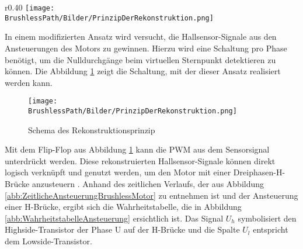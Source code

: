         \ifEMBED
        \begin{wrapfigure}{r}{0.40\textwidth}
            \texttt{[image: \\BrushlessPath/Bilder/PrinzipDerRekonstruktion.png]}
            \centering
            \caption[Schema des Rekonstruktionsprinzip]{Schema des Rekonstruktionsprinzip \cite{HSLU:Pluess}}
            \label{abb:PrinzipRekonstruktion}
            \end{wrapfigure}
        \fi
        In einem modifizierten Ansatz wird versucht, die Hallsensor-Signale 
        aus den Ansteuerungen des Motors zu gewinnen. Hierzu wird 
        eine Schaltung pro Phase benötigt, um die Nulldurchgänge beim 
        virtuellen Sternpunkt detektieren zu können. Die Abbildung 
        \ref{abb:PrinzipRekonstruktion} zeigt die Schaltung, mit der dieser Ansatz 
        realisiert werden kann. 
        \ifSTANDALONE
	\begin{figure}[h!]
            \centering
            \texttt{[image: \\BrushlessPath/Bilder/PrinzipDerRekonstruktion.png]}
           	\caption{Schema des Rekonstruktionsprinzip \protect\cite{HSLU:Pluess}}
            \label{abb:PrinzipRekonstruktion}
        \end{figure}
        \fi
        Mit dem Flip-Flop aus Abbildung \ref{abb:PrinzipRekonstruktion} kann die PWM aus dem 
        Sensorsignal unterdrückt werden. Diese rekonstruierten 
        Hallsensor-Signale können direkt logisch verknüpft und genutzt 
        werden, um den Motor mit einer Dreiphasen-H-Brücke anzusteuern 
        \cite{HSLU:Pluess}. Anhand des zeitlichen Verlaufs, der aus Abbildung 
        \ref{abb:ZeitlicheAnsteuerungBrushlessMotor} zu entnehmen ist und der 
        Ansteuerung einer H-Brücke, ergibt sich die Wahrheitstabelle, die in 
        Abbildung \ref{abb:WahrheitstabelleAnsteuerung} ersichtlich ist. Das 
        Signal $U_h$ symbolisiert den Highside-Transistor der Phase U auf der 
        H-Brücke und die Spalte $U_l$ entspricht dem Lowside-Transistor.\\      
        
